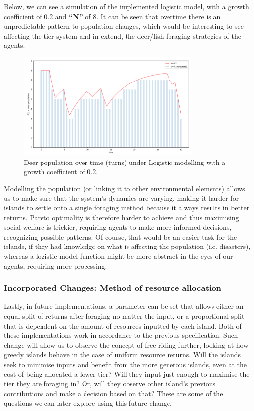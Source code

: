 Below, we can see a simulation of the implemented logistic model, with a growth coefficient of 0.2 and \textbf{“N”} of 8. It can be seen that overtime there is an unpredictable pattern to population changes, which would be interesting to see affecting the tier system and in extend, the deer/fish foraging strategies of the agents.\\

\begin{figure}[!htb]
    \centering
    \includegraphics[width=0.8\textwidth]{04_environment/Images/Deer population over time.PNG}
    \caption{Deer population over time (turns) under Logistic modelling with a growth coefficient of 0.2.}
    \label{Images:Deer population over time}
\end{figure}

Modelling the population (or linking it to other environmental elements) allows us to make sure that the system’s dynamics are varying, making it harder for islands to settle onto a single foraging method because it always results in better returns. Pareto optimality is therefore harder to achieve and thus maximising social welfare is trickier, requiring agents to make more informed decisions, recognizing possible patterns. Of course, that would be an easier task for the islands, if they had knowledge on what is affecting the population (i.e. disasters), whereas a logistic model function might be more abstract in the eyes of our agents, requiring more processing. \\

\subsubsection{ Incorporated Changes: Method of resource allocation}

Lastly, in future implementations, a parameter can be set that allows either an equal split of returns after foraging no matter the input, or a proportional split that is dependent on the amount of resources inputted by each island. Both of these implementations work in accordance to the previous specification. Such change will allow us to observe the concept of free-riding further, looking at how greedy islands behave in the case of uniform resource returns. Will the islands seek to minimise inputs and benefit from the more generous islands, even at the cost of being allocated a lower tier? Will they input just enough to maximise the tier they are foraging in? Or, will they observe other island’s previous contributions and make a decision based on that? These are some of the questions we can later explore using this future change. \\

